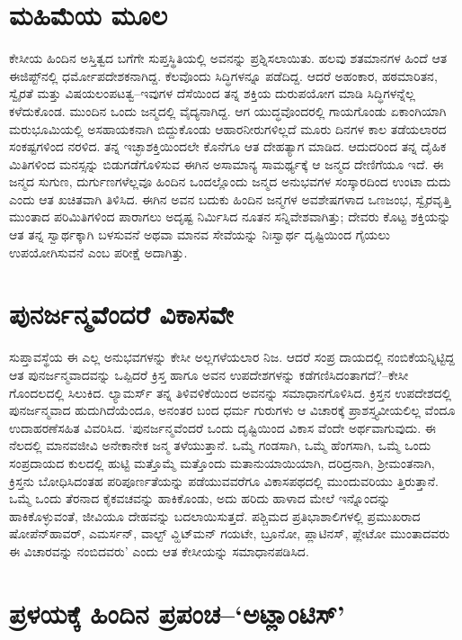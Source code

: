 \section{ಮಹಿಮೆಯ ಮೂಲ}

ಕೇಸೀಯ ಹಿಂದಿನ ಅಸ್ತಿತ್ವದ ಬಗೆಗೇ ಸುಪ್ತಸ್ಥಿತಿಯಲ್ಲಿ ಅವನನ್ನು ಪ್ರಶ್ನಿಸಲಾಯಿತು. ಹಲವು ಶತಮಾನಗಳ ಹಿಂದೆ ಆತ ಈಜಿಪ್ಟ್​ನಲ್ಲಿ ಧರ್ಮೋಪದೇಶಕನಾಗಿದ್ದ. ಕೆಲವೊಂದು ಸಿದ್ಧಿಗಳನ್ನೂ ಪಡೆದಿದ್ದ. ಆದರೆ ಅಹಂಕಾರ, ಹಠಮಾರಿತನ, ಸ್ವೈರತೆ ಮತ್ತು ವಿಷಯಲಂಪಟತ್ವ–ಇವುಗಳ ದೆಸೆಯಿಂದ ತನ್ನ ಶಕ್ತಿಯ ದುರುಪಯೋಗ ಮಾಡಿ ಸಿದ್ಧಿಗಳನ್ನೆಲ್ಲ ಕಳೆದುಕೊಂಡ. ಮುಂದಿನ ಒಂದು ಜನ್ಮದಲ್ಲಿ ವೈದ್ಯನಾಗಿದ್ದ. ಆಗ ಯುದ್ಧವೊಂದರಲ್ಲಿ ಗಾಯಗೊಂಡು ಏಕಾಂಗಿಯಾಗಿ ಮರುಭೂಮಿಯಲ್ಲಿ ಅಸಹಾಯಕನಾಗಿ ಬಿದ್ದುಕೊಂಡು ಆಹಾರನೀರುಗಳಿಲ್ಲದೆ ಮೂರು ದಿನಗಳ ಕಾಲ ತಡೆಯಲಾರದ ಸಂಕಷ್ಟಗಳಿಂದ ನರಳಿದ. ತನ್ನ ಇಚ್ಛಾಶಕ್ತಿಯಿಂದಲೇ ಕೊನೆಗೂ ಆತ ದೇಹತ್ಯಾಗ ಮಾಡಿದ. ಆದುದರಿಂದ ತನ್ನ ದೈಹಿಕ ಮಿತಿಗಳಿಂದ ಮನಸ್ಸನ್ನು ಬಿಡುಗಡೆಗೊಳಿಸುವ ಈಗಿನ ಅಸಾಮಾನ್ಯ ಸಾಮರ್ಥ್ಯಕ್ಕೆ ಆ ಜನ್ಮದ ದೇಣಿಗೆಯೂ ಇದೆ. ಈ ಜನ್ಮದ ಸುಗುಣ, ದುರ್ಗುಣಗಳೆಲ್ಲವೂ ಹಿಂದಿನ ಒಂದಲ್ಲೊಂದು ಜನ್ಮದ ಅನುಭವಗಳ ಸಂಸ್ಕಾರದಿಂದ ಉಂಟಾ ದುದು ಎಂದು ಆತ ಖಚಿತವಾಗಿ ತಿಳಿಸಿದ. ಈಗಿನ ಅವನ ಬದುಕು ಹಿಂದಿನ ಜನ್ಮಗಳ ಅವಶೇಷಗಳಾದ ಒಣಜಂಭ, ಸ್ವೈರವೃತ್ತಿ ಮುಂತಾದ ಪರಿಮಿತಿಗಳಿಂದ ಪಾರಾಗಲು ಅದೃಷ್ಟ ನಿರ್ಮಿಸಿದ ನೂತನ ಸನ್ನಿವೇಶವಾಗಿತ್ತು; ದೇವರು ಕೊಟ್ಟ ಶಕ್ತಿಯನ್ನು ಆತ ತನ್ನ ಸ್ವಾರ್ಥಕ್ಕಾಗಿ ಬಳಸುವನೆ ಅಥವಾ ಮಾನವ ಸೇವೆಯನ್ನು ನಿಃಸ್ವಾರ್ಥ ದೃಷ್ಟಿಯಿಂದ ಗೈಯಲು ಉಪಯೋಗಿಸುವನೆ ಎಂಬ ಪರೀಕ್ಷೆ ಅದಾಗಿತ್ತು.


\section{ಪುನರ್ಜನ್ಮವೆಂದರೆ ವಿಕಾಸವೇ}

ಸುಪ್ತಾವಸ್ಥೆಯ ಈ ಎಲ್ಲ ಅನುಭವಗಳನ್ನು ಕೇಸೀ ಅಲ್ಲಗಳೆಯಲಾರ ನಿಜ. ಆದರೆ ಸಂಪ್ರ ದಾಯದಲ್ಲಿ ನಂಬಿಕೆಯನ್ನಿಟ್ಟಿದ್ದ ಆತ ಪುನರ್ಜನ್ಮವಾದವನ್ನು ಒಪ್ಪಿದರೆ ಕ್ರಿಸ್ತ ಹಾಗೂ ಅವನ ಉಪದೇಶಗಳನ್ನು ಕಡೆಗಣಿಸಿದಂತಾಗದೆ?–ಕೇಸೀ ಗೊಂದಲದಲ್ಲಿ ಸಿಲುಕಿದ. ಲ್ಯಾಮರ್ಸ್ ತನ್ನ ತಿಳಿವಳಿಕೆಯಿಂದ ಅವನನ್ನು ಸಮಾಧಾನಗೊಳಿಸಿದ. ಕ್ರಿಸ್ತನ ಉಪದೇಶದಲ್ಲಿ ಪುನರ್ಜನ್ಮವಾದ ಹುದುಗಿದೆಯೆಂದೂ, ಅನಂತರ ಬಂದ ಧರ್ಮ ಗುರುಗಳು ಆ ವಿಚಾರಕ್ಕೆ ಪ್ರಾಶಸ್ತ್ಯವೀಯಲಿಲ್ಲ ವೆಂದೂ ಉದಾಹರಣೆಸಹಿತ ವಿವರಿಸಿದ. ‘ಪುನರ್ಜನ್ಮವೆಂದರೆ ಒಂದು ದೃಷ್ಟಿಯಿಂದ ವಿಕಾಸ ವೆಂದೇ ಅರ್ಥವಾಗುವುದು. ಈ ನೆಲದಲ್ಲಿ ಮಾನವಜೀವಿ ಅನೇಕಾನೇಕ ಜನ್ಮ ತಳೆಯುತ್ತಾನೆ. ಒಮ್ಮೆ ಗಂಡಸಾಗಿ, ಒಮ್ಮೆ ಹೆಂಗಸಾಗಿ, ಒಮ್ಮೆ ಒಂದು ಸಂಪ್ರದಾಯದ ಕುಲದಲ್ಲಿ ಹುಟ್ಟಿ ಮತ್ತೊಮ್ಮೆ ಮತ್ತೊಂದು ಮತಾನುಯಾಯಿಯಾಗಿ, ದರಿದ್ರನಾಗಿ, ಶ‍್ರೀಮಂತನಾಗಿ, ಕ್ರಿಸ್ತನು ಬೋಧಿಸಿದಂತಹ ಪರಿಪೂರ್ಣತೆಯನ್ನು ಪಡೆಯುವವರೆಗೂ ವಿಕಾಸಪಥದಲ್ಲಿ ಮುಂದುವರಿಯು ತ್ತಿರುತ್ತಾನೆ. ಒಮ್ಮೆ ಒಂದು ತೆರನಾದ ಕೈಕವಚವನ್ನು ಹಾಕಿಕೊಂಡು, ಅದು ಹರಿದು ಹಾಳಾದ ಮೇಲೆ ಇನ್ನೊಂದನ್ನು ಹಾಕಿಕೊಳ್ಳುವಂತೆ, ಜೀವಿಯೂ ದೇಹವನ್ನು ಬದಲಾಯಿಸುತ್ತದೆ. ಪಶ್ಚಿಮದ ಪ್ರತಿಭಾಶಾಲಿಗಳಲ್ಲಿ ಪ್ರಮುಖರಾದ ಷೋಪೆನ್​ಹಾವರ್, ಎಮರ್ಸನ್, ವಾಲ್ಟ್ ವ್ಹಿಟ್​ಮನ್ ಗಯಟೇ, ಬ್ರೂನೋ, ಪ್ಲಾಟಿನಸ್, ಪ್ಲೇಟೋ ಮುಂತಾದವರು ಈ ವಿಚಾರವನ್ನು ನಂಬಿದವರು’ ಎಂದು ಆತ ಕೇಸೀಯನ್ನು ಸಮಾಧಾನಪಡಿಸಿದ.


\section{ಪ್ರಳಯಕ್ಕೆ ಹಿಂದಿನ ಪ್ರಪಂಚ–‘ಅಟ್ಲಾಂಟಿಸ್​'}

